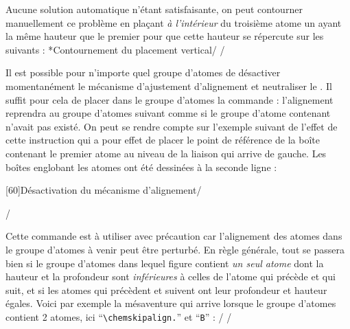 \documentclass[10pt]{article}
\makeatletter
\newcommand\idx{\@ifstar{\let\print@or@not\@gobble\idx@}{\let\print@or@not\@firstofone\idx@}}
\newcommand\idx@[1]{%
	\ifcat\expandafter\noexpand\@car#1\@nil\relax%
		\expandafter\ifx\@car#1\@nil\protect
			\index{#1}%
			\print@or@not{#1}%
		\else
			\saveexpandmode\expandarg
			\StrSubstitute{\string#1}{\string @}{\@empty\protect\symbol{'100}}[\temp@]%
			\StrGobbleLeft\temp@1[\temp@]%
			\restoreexpandmode
			\expandafter\index\expandafter{\temp@ @\protect\texttt{\protect\textbackslash\temp@}}%
			\print@or@not{\texttt{\string#1}}%
		\fi
	\else
		\index{#1}%
		\print@or@not{#1}%
	\fi
}
\newcommand\make@car@active[2]{%
	\catcode`#1\active
	\begingroup
		\lccode`\~`#1\relax
		\lowercase{\endgroup\def~{#2}}%
}
\newif\if@exstar
\newcommand\exemple{%
	\begingroup
	\parskip\z@
	\@makeother\;\@makeother\!\@makeother\?\@makeother\:%
	\@ifstar{\@exstartrue\exemple@}{\@exstarfalse\exemple@}}
\newcommand\exemple@[2][65]{%
	\medbreak\noindent
	\begingroup
		\let\do\@makeother\dospecials
		\make@car@active\ { {}}%
		\make@car@active\^^M{\par\leavevmode}%
		\make@car@active\,{\leavevmode\kern\z@\string,}%
		\make@car@active\-{\leavevmode\kern\z@\string-}%
		\make@car@active\>{\leavevmode\kern\z@\string>}%
		\make@car@active\<{\leavevmode\kern\z@\string<}%
		\exemple@@{#1}{#2}%
}
\newcommand\exemple@@[3]{%
	\def\@tempa##1#3{\exemple@@@{#1}{#2}{##1}}%
	\@tempa
}
\newcommand\exemple@@@[3]{%
	\xdef\the@code{#3}%
	\endgroup
	\if@exstar
		\begingroup
			\fboxrule0.4pt
			\let\breakboxparindent\z@
			\def\bkvz@bottom{\hrule\@height\fboxrule}%
			\let\bkvz@before@breakbox\relax
			\def\bkvz@set@linewidth{\advance\linewidth\dimexpr-2\fboxrule-2\fboxsep}%
			\def\bkvz@left{\vrule\@width\fboxrule\hskip\fboxsep}%
			\def\bkvz@right{\hskip\fboxsep\vrule\@width\fboxrule}%
			\def\bkvz@top{\hbox to \hsize{%
				\vrule\@width\fboxrule\@height\fboxrule
				\leaders\bkvz@bottom\hfill
				\ECFAugie
				\fboxsep\z@
				\colorbox{black}{\kern0.25em\color{white}\footnotesize\lower0.5ex\hbox{\strut#2}\kern0.25em}%
				\leaders\bkvz@bottom\hfill
				\vrule\@width\fboxrule\@height\fboxrule}}%
			\breakbox
				\kern.5ex\relax
				\ttfamily\footnotesize\the@code\par
				\normalfont
				\kern3pt
				\hrule height0.1pt width\linewidth depth0.1pt
				\vskip5pt
				\rightskip0pt plus 1fill
				\everypar{{\color{lightgray}\rlap{\vrule height0.1pt width\linewidth depth0.1pt}}\hskip0pt plus 1fill}%
				\newlinechar`\^^M\everyeof{\noexpand}\scantokens{#3}\par
			\endbreakbox
		\endgroup
	\else
		\vskip0.5ex
		\boxput*(0,1)
			{\fboxsep\z@
			\hbox{\ECFAugie\colorbox{black}{\leavevmode\kern0.25em{\color{white}\footnotesize\strut#2}\kern0.25em}}%
			}%
			{\fboxsep5pt
			\fbox{%
				$\vcenter{\hsize\dimexpr0.#1\linewidth-\fboxsep-\fboxrule\relax
					\kern5pt\parskip0pt \ttfamily\footnotesize\the@code}%
				\vcenter{\kern5pt\hsize\dimexpr\linewidth-0.#1\linewidth-\fboxsep-\fboxrule\relax
					\everypar{{\color{lightgray}\rlap{\vrule height0.1pt width\dimexpr\linewidth-0.#1\linewidth-\fboxsep-\fboxrule depth0.1pt}}}%
					\footnotesize\newlinechar`\^^M\everyeof{\noexpand}\scantokens{#3}}$%
				}%
			}%
	\fi
	\medbreak
	\endgroup
}
\let\do\@makeother\dospecials
\makeatother
\begin{document}
Aucune solution automatique n'étant satisfaisante, on peut contourner manuellement ce problème en plaçant \emph{à l'intérieur} du troisième atome un \idx{\vphantom} ayant la même hauteur que le premier pour que cette hauteur se répercute sur les suivants :
\exemple*{Contournement du placement vertical}/\Huge\setatomsep{2em}
\qquad
{}/

\label{chemskipalign}Il est possible pour n'importe quel groupe d'atomes de désactiver momentanément le mécanisme d'ajustement d'alignement et neutraliser le \idx\vphantom. Il suffit pour cela de placer dans le groupe d'atomes la commande \idx{\chemskipalign} : l'alignement reprendra au groupe d'atomes suivant comme si le groupe d'atome contenant \idx{\chemskipalign} n'avait pas existé. On peut se rendre compte sur l'exemple suivant de l'effet de cette instruction qui a pour effet de placer le point de référence de la boîte contenant le premier atome au niveau de la liaison qui arrive de gauche. Les boîtes englobant les atomes ont été dessinées à la seconde ligne :

\exemple[60]{Désactivation du mécanisme d'alignement}/\large
{}\quad
{}\par\bigskip
\fboxsep=0pt
\renewcommand\printatom[1]{\fbox{\ensuremath{\mathrm{#1}}}}
\quad
{}/

Cette commande est à utiliser avec précaution car l'alignement des atomes dans le groupe d'atomes à venir peut être perturbé. En règle générale, tout se passera bien si le groupe d'atomes dans lequel figure \idx{\chemskipalign} contient \emph{un seul atome} dont la hauteur et la profondeur sont \emph{inférieures} à celles de l'atome qui précède et qui suit, et si les atomes qui précèdent et suivent ont leur profondeur et hauteur égales. Voici par exemple la mésaventure qui arrive lorsque le groupe d'atomes contient 2 atomes, ici ``\verb-\chemskipalign.-'' et ``\verb-B-'' :
\exemple{Conséquence de la commande \string\chemskipalign}/\large
\fboxsep=0pt
\renewcommand\printatom[1]{\fbox{\ensuremath{\mathrm{#1}}}}
/
\end{document}
